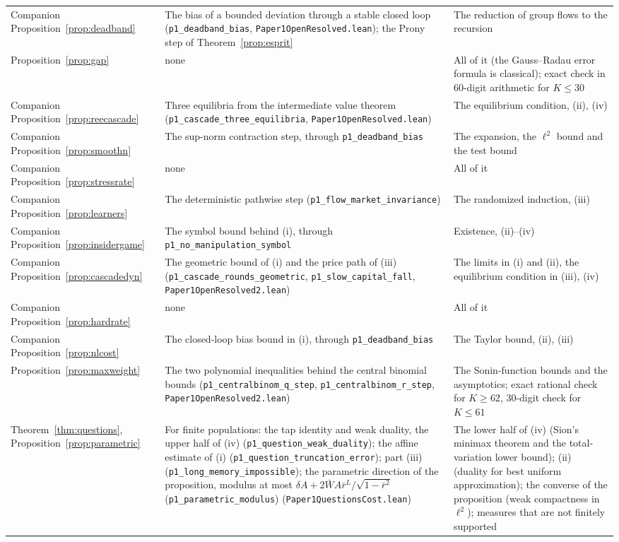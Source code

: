 \documentclass[12pt]{article}
\theoremstyle{definition}
\theoremstyle{remark}
\begin{document}
\begin{longtable}{>{\raggedright\arraybackslash}p{}>{\raggedright\arraybackslash}p{}>{\raggedright\arraybackslash}p{}}
Companion Proposition~\ref{prop:deadband} & The bias of a bounded deviation through a stable closed loop (\texttt{p1\_deadband\_bias}, \nolinkurl{Paper1OpenResolved.lean}); the Prony step of Theorem~\ref{prop:esprit} & The reduction of group flows to the recursion\\
Proposition~\ref{prop:gap} & none & All of it (the Gauss--Radau error formula is classical); exact check in 60-digit arithmetic for $K\le30$\\
Companion Proposition~\ref{prop:reecascade} & Three equilibria from the intermediate value theorem (\texttt{p1\_cascade\_three\_equilibria}, \nolinkurl{Paper1OpenResolved.lean}) & The equilibrium condition, (ii), (iv)\\
Companion Proposition~\ref{prop:smoothn} & The sup-norm contraction step, through \texttt{p1\_deadband\_bias} & The expansion, the $\ell^2$ bound and the test bound\\
Companion Proposition~\ref{prop:stressrate} & none & All of it\\
Companion Proposition~\ref{prop:learners} & The deterministic pathwise step (\texttt{p1\_flow\_market\_invariance}) & The randomized induction, (iii)\\
Companion Proposition~\ref{prop:insidergame} & The symbol bound behind (i), through \texttt{p1\_no\_manipulation\_symbol} & Existence, (ii)--(iv)\\
Companion Proposition~\ref{prop:cascadedyn} & The geometric bound of (i) and the price path of (iii) (\texttt{p1\_cascade\_rounds\_geometric}, \texttt{p1\_slow\_capital\_fall}, \nolinkurl{Paper1OpenResolved2.lean}) & The limits in (i) and (ii), the equilibrium condition in (iii), (iv)\\
Companion Proposition~\ref{prop:hardrate} & none & All of it\\
Companion Proposition~\ref{prop:nlcost} & The closed-loop bias bound in (i), through \texttt{p1\_deadband\_bias} & The Taylor bound, (ii), (iii)\\
Proposition~\ref{prop:maxweight} & The two polynomial inequalities behind the central binomial bounds (\texttt{p1\_centralbinom\_q\_step}, \texttt{p1\_centralbinom\_r\_step}, \nolinkurl{Paper1OpenResolved2.lean}) & The Sonin-function bounds and the asymptotics; exact rational check for $K\ge62$, 30-digit check for $K\le61$\\
Theorem~\ref{thm:questions}, Proposition~\ref{prop:parametric} & For finite populations: the tap identity and weak duality, the upper half of (iv) (\texttt{p1\_question\_weak\_duality}); the affine estimate of (i) (\texttt{p1\_question\_truncation\_error}); part (iii) (\texttt{p1\_long\_memory\_impossible}); the parametric direction of the proposition, modulus at most $\delta A+2\bar WA\bar r^L/\sqrt{1-\bar r^2}$ (\texttt{p1\_parametric\_modulus}) (\nolinkurl{Paper1QuestionsCost.lean}) & The lower half of (iv) (Sion's minimax theorem and the total-variation lower bound); (ii) (duality for best uniform approximation); the converse of the proposition (weak compactness in $\ell^2$); measures that are not finitely supported\\

\end{longtable}
\end{document}
